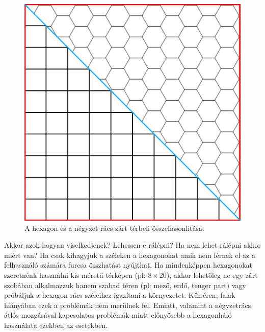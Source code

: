 \begin{figure}[h]
\centering
\includegraphics[scale=0.1]{kepek/img24.png}
\caption{A hexagon és a négyzet rács zárt térbeli összehasonlítása.}
\label{fig:img24}
\end{figure}

\noindent Akkor azok hogyan viselkedjenek? 
\newline Lehessen-e rálépni?
\newline Ha nem lehet rálépni akkor miért van?
\newline
\newline Ha csak kihagyjuk a széleken a hexagonokat amik nem férnek el az a felhasználó számára furcsa összhatást nyújthat.
\newline
\newline Ha mindenképpen hexagonokat  szeretnénk használni kis méretű térképen (pl: $8 \times 20$), akkor lehetőleg ne egy zárt szobában alkalmazzuk hanem szabad téren (pl: mező, erdő, tenger part) vagy próbáljuk a hexagon rács széleihez igazítani a környezetet.
\newline
\newline Kültéren, falak hiányában ezek a problémák nem merülnek fel. Emiatt, valamint a négyzetrács átlós mozgásával kapcsolatos problémák miatt előnyösebb a hexagonháló használata ezekben az esetekben.

